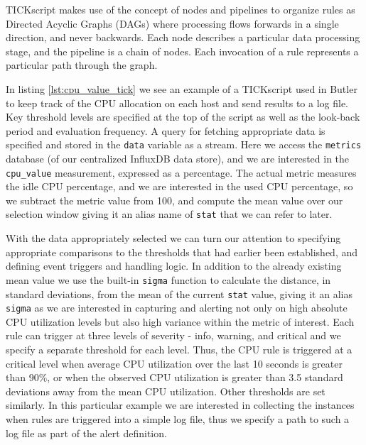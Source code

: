 TICKscript makes use of the concept of nodes and pipelines to organize rules as Directed Acyclic Graphs (DAGs) where processing flows forwards in a single direction, and never backwards. Each node describes a particular data processing stage, and the pipeline is a chain of nodes. Each invocation of a rule represents a particular path through the graph.

In listing \ref{lst:cpu_value_tick} we see an example of a TICKscript used in Butler to keep track of the CPU allocation on each host and send results to a log file. Key threshold levels are specified at the top of the script as well as the look-back period and evaluation frequency. A query for fetching appropriate data is specified and stored in the \texttt{data} variable as a stream. Here we access the \texttt{metrics} database (of our centralized InfluxDB data store), and we are interested in the \texttt{cpu_value} measurement, expressed as a percentage. The actual metric measures the idle CPU percentage, and we are interested in the used CPU percentage, so we subtract the metric value from 100, and compute the mean value over our selection window giving it an alias name of \texttt{stat} that we can refer to later. 

With the data appropriately selected we can turn our attention to specifying appropriate comparisons to the thresholds that had earlier been established, and defining event triggers and handling logic. In addition to the already existing mean value we use the built-in \texttt{sigma} function to calculate the distance, in standard deviations, from the mean of the current \texttt{stat} value, giving it an alias \texttt{sigma} as we are interested in capturing and alerting not only on high absolute CPU utilization levels but also high variance within the metric of interest. Each rule can trigger at three levels of severity - info, warning, and critical and we specify a separate threshold for each level. Thus, the CPU rule is triggered at a critical level when average CPU utilization over the last 10 seconds is greater than 90\%, or when the observed CPU utilization is greater than 3.5 standard deviations away from the mean CPU utilization. Other thresholds are set similarly. In this particular example we are interested in collecting the instances when rules are triggered into a simple log file, thus we specify a path to such a log file as part of the alert definition.

